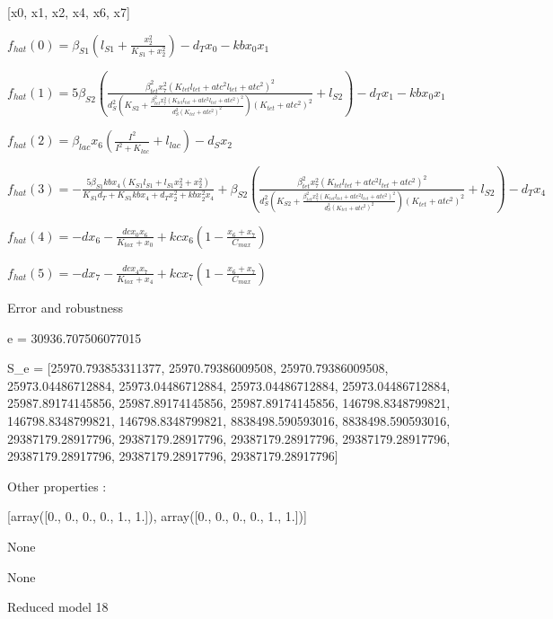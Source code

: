 [x0, x1, x2, x4, x6, x7]


$f_{hat}(0)=\beta_{S1} \left(l_{S1} + \frac{x_{2}^{2}}{K_{S1} + x_{2}^{2}}\right) - d_{T} x_{0} - kb x_{0} x_{1}$


$f_{hat}(1)=5 \beta_{S2} \left(\frac{\beta_{tet}^{2} x_{7}^{2} \left(K_{tet} l_{tet} + atc^{2} l_{tet} + atc^{2}\right)^{2}}{d_{S}^{2} \left(K_{S2} + \frac{\beta_{tet}^{2} x_{7}^{2} \left(K_{tet} l_{tet} + atc^{2} l_{tet} + atc^{2}\right)^{2}}{d_{S}^{2} \left(K_{tet} + atc^{2}\right)^{2}}\right) \left(K_{tet} + atc^{2}\right)^{2}} + l_{S2}\right) - d_{T} x_{1} - kb x_{0} x_{1}$


$f_{hat}(2)=\beta_{lac} x_{6} \left(\frac{I^{2}}{I^{2} + K_{lac}} + l_{lac}\right) - d_{S} x_{2}$


$f_{hat}(3)=- \frac{5 \beta_{S1} kb x_{4} \left(K_{S1} l_{S1} + l_{S1} x_{2}^{2} + x_{2}^{2}\right)}{K_{S1} d_{T} + K_{S1} kb x_{4} + d_{T} x_{2}^{2} + kb x_{2}^{2} x_{4}} + \beta_{S2} \left(\frac{\beta_{tet}^{2} x_{7}^{2} \left(K_{tet} l_{tet} + atc^{2} l_{tet} + atc^{2}\right)^{2}}{d_{S}^{2} \left(K_{S2} + \frac{\beta_{tet}^{2} x_{7}^{2} \left(K_{tet} l_{tet} + atc^{2} l_{tet} + atc^{2}\right)^{2}}{d_{S}^{2} \left(K_{tet} + atc^{2}\right)^{2}}\right) \left(K_{tet} + atc^{2}\right)^{2}} + l_{S2}\right) - d_{T} x_{4}$


$f_{hat}(4)=- d x_{6} - \frac{dc x_{0} x_{6}}{K_{tox} + x_{0}} + kc x_{6} \left(1 - \frac{x_{6} + x_{7}}{C_{max}}\right)$


$f_{hat}(5)=- d x_{7} - \frac{dc x_{4} x_{7}}{K_{tox} + x_{4}} + kc x_{7} \left(1 - \frac{x_{6} + x_{7}}{C_{max}}\right)$



Error and robustness 


e = 30936.707506077015

S_e = [25970.793853311377, 25970.79386009508, 25970.79386009508, 25973.04486712884, 25973.04486712884, 25973.04486712884, 25973.04486712884, 25987.89174145856, 25987.89174145856, 25987.89174145856, 146798.8348799821, 146798.8348799821, 146798.8348799821, 8838498.590593016, 8838498.590593016, 29387179.28917796, 29387179.28917796, 29387179.28917796, 29387179.28917796, 29387179.28917796, 29387179.28917796, 29387179.28917796]

Other properties :


[array([0., 0., 0., 0., 1., 1.]), array([0., 0., 0., 0., 1., 1.])]

None

None

Reduced model 18

